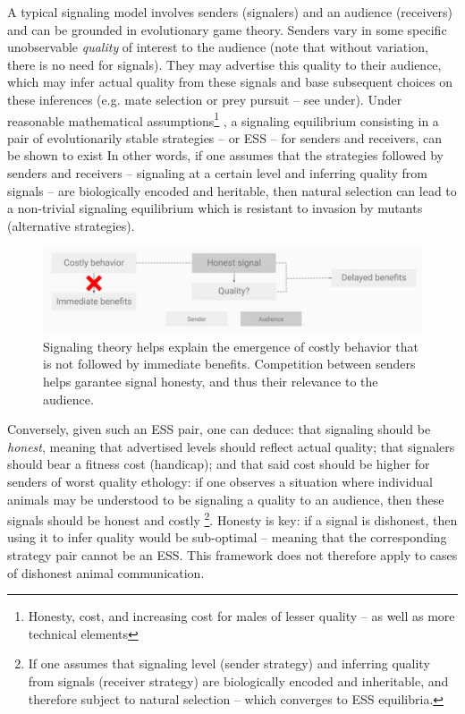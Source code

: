 \documentclass[a4paper,12pt]{report}
\begin{document}
A typical signaling model involves senders (signalers) and an audience
(receivers) and can be grounded in evolutionary game theory.
Senders vary in some specific unobservable \emph{quality} of interest to the audience
(note that without variation, there is no need for signals).
They may advertise this quality to their audience, which may infer actual quality
from these signals and base subsequent choices on these inferences
(e.g. mate selection or prey pursuit – see under). Under reasonable mathematical
assumptions\footnote{
    Honesty, cost, and increasing cost for males of lesser quality –
    as well as more technical elements %
    }
, a signaling equilibrium consisting in a pair of evolutionarily
stable strategies – or ESS %
– for senders and receivers, can be shown to exist %
In other words, if one assumes that the strategies followed by senders and receivers
– signaling at a certain level and inferring quality from signals –
are biologically encoded and heritable, then natural selection
can lead to a non-trivial signaling equilibrium which is resistant to
invasion by mutants (alternative strategies).

\begin{figure}[h]
    \centering
    \includegraphics[width=1\textwidth]{Slides_red}
    \caption{Signaling theory helps explain the emergence of costly behavior
    that is not followed by immediate benefits. Competition between senders helps garantee
    signal honesty, and thus their relevance to the audience.}
    \label{fig:signal}
    \end{figure}
    

Conversely, given such an ESS pair, one can deduce: that signaling should be \emph{honest},
meaning that advertised levels should reflect actual quality; that signalers should
bear a fitness cost (handicap); and that said cost should be higher for senders
of worst quality %
ethology: if one observes a situation where individual animals may be understood to
be signaling a quality to an audience, then these signals should be honest and costly
\footnote{If one assumes that signaling level (sender strategy) and inferring quality
from signals (receiver strategy) are biologically encoded and inheritable, 
and therefore subject to natural selection – which converges to ESS equilibria.}.
Honesty is key: if a signal is dishonest, then using it to infer quality would be
sub-optimal – meaning that the corresponding strategy pair cannot be an ESS.
This framework does not therefore apply to cases of dishonest animal communication.
\end{document}
